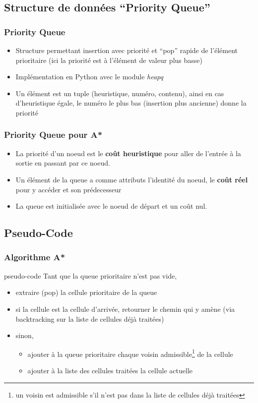 \documentclass{beamer}
\begin{document}
\subsection{Structure de données ``Priority Queue''}
\begin{frame}
  \frametitle{Priority Queue}
  \begin{itemize}
  \item Structure permettant insertion avec priorité et ``pop'' rapide de
    l'élément prioritaire (ici la priorité est à l'élément de valeur plus basse)
  \item Implémentation en Python avec le module \textit{heapq}
  \item Un élément est un tuple (heuristique, numéro, contenu), ainsi en cas
    d'heuristique égale, le numéro le plus bas (insertion plus ancienne) donne
    la priorité
  \end{itemize}
\end{frame}
\begin{frame}
  \frametitle{Priority Queue pour A*}
  \begin{itemize}
  \item<1-> La priorité d'un noeud est le \textbf{coût heuristique} pour aller de
    l'entrée à la sortie en passant par ce noeud.
  \item<2-> Un élément de la queue a comme attributs l'identité du noeud, le
    \textbf{coût réel} pour y accéder et son prédecesseur
  \item<3-> La queue est initialisée avec le noeud de départ et un coût nul.
  \end{itemize}
\end{frame}

\subsection{Pseudo-Code}
\begin{frame}
  \frametitle{Algorithme A*}
  \begin{block}{pseudo-code}
    Tant que la queue prioritaire n'est pas vide,
    \begin{itemize}
    \item<2-> extraire (pop) la cellule prioritaire de la queue
    \item<3-> si la cellule est la cellule d'arrivée, retourner le chemin qui y amène
          (via backtracking sur la liste de cellules déjà traitées)
    \item<4-> sinon,
      \begin{itemize}
      \item<4-> ajouter à la queue prioritaire chaque voisin admissible\footnote{un
          voisin est admissible s'il n'est pas dans la liste de cellules déjà
          traitées} de la cellule
      \item<5-> ajouter à la liste des cellules traitées la cellule actuelle
      \end{itemize}
    \end{itemize}    
  \end{block}
\end{frame}
\end{document}
